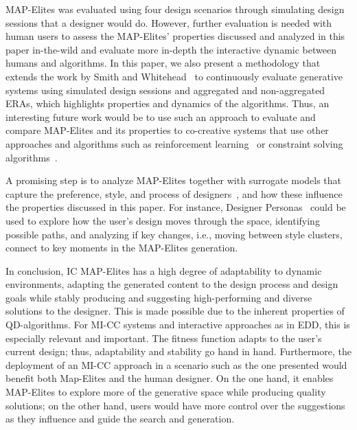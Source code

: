 MAP-Elites was evaluated using four design scenarios through simulating design sessions that a designer would do. However, further evaluation is needed with human users to assess the MAP-Elites' properties discussed and analyzed in this paper in-the-wild and evaluate more in-depth the interactive dynamic between humans and algorithms. In this paper, we also present a methodology that extends the work by Smith and Whitehead~ to continuously evaluate generative systems using simulated design sessions and aggregated and non-aggregated ERAs, which highlights properties and dynamics of the algorithms. Thus, an interesting future work would be to use such an approach to evaluate and compare MAP-Elites and its properties to co-creative systems that use other approaches and algorithms such as reinforcement learning~ or constraint solving algorithms~.



A promising step is to analyze MAP-Elites together with surrogate models that capture the preference, style, and process of designers~, and how these influence the properties discussed in this paper. For instance, Designer Personas~ could be used to explore how the user's design moves through the space, identifying possible paths, and analyzing if key changes, i.e., moving between style clusters, connect to key moments in the MAP-Elites generation.

In conclusion, IC MAP-Elites has a high degree of adaptability to dynamic environments, adapting the generated content to the design process and design goals while stably producing and suggesting high-performing and diverse solutions to the designer. This is made possible due to the inherent properties of QD-algorithms. For MI-CC systems and interactive approaches as in EDD, this is especially relevant and important. The fitness function adapts to the user's current design; thus, adaptability and stability go hand in hand. Furthermore, the deployment of an MI-CC approach in a scenario such as the one presented would benefit both Map-Elites and the human designer. On the one hand, it enables MAP-Elites to explore more of the generative space while producing quality solutions; on the other hand, users would have more control over the suggestions as they influence and guide the search and generation.

